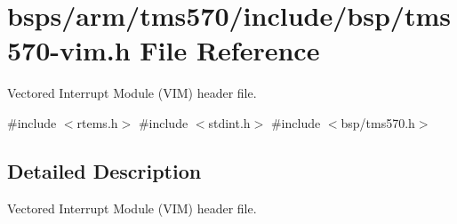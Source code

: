 \hypertarget{tms570-vim_8h}{}\section{bsps/arm/tms570/include/bsp/tms570-\/vim.h File Reference}
\label{tms570-vim_8h}


Vectored Interrupt Module (V\+IM) header file.  


{\ttfamily \#include $<$rtems.\+h$>$}\newline
{\ttfamily \#include $<$stdint.\+h$>$}\newline
{\ttfamily \#include $<$bsp/tms570.\+h$>$}\newline


\subsection{Detailed Description}
Vectored Interrupt Module (V\+IM) header file. 

